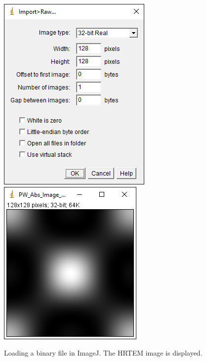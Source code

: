 \documentclass[12pt,a4paper]{article}
\begin{document}
\begin{figure}[!h]
\begin{center}
    \includegraphics[scale=0.75]{ImageJ_ImportRaw.png}
    \includegraphics[scale=0.75]{pw_abs_image.png}
\caption{Loading a binary file in ImageJ. The HRTEM image is displayed.}
\label{fig:ImageJ_ImportRaw}
\end{center}
\end{figure}
\end{document}

